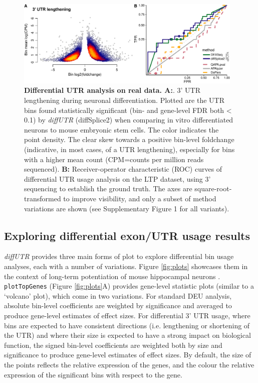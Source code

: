 \documentclass{bmcart}
\begin{document}
\begin{figure}
\includegraphics[width=0.97\textwidth]{figure3.pdf}
\caption{\textbf{Differential UTR analysis on real data. A:}. 3' UTR lengthening during neuronal differentiation. Plotted are the UTR bins found statistically significant (bin- and gene-level FDR both < 0.1) by \textit{diffUTR} (diffSplice2) when comparing in vitro differentiated neurons to mouse embryonic stem cells. The color indicates the point density. The clear skew towards a positive bin-level foldchange (indicative, in most cases, of a UTR lengthening), especially for bins with a higher mean count (CPM=counts per million reads sequenced). \textbf{B:} Receiver-operator characteristic (ROC) curves of differential UTR usage analysis on the LTP dataset, using 3' sequencing to establish the ground truth. The axes are square-root-transformed to improve visibility, and only a subset of method variations are shown (see Supplementary Figure 1 for all variants).}
\label{fig:realdata}
\end{figure}


\subsection*{Exploring differential exon/UTR usage results}

\textit{diffUTR} provides three main forms of plot to explore differential bin usage analyses, each with a number of variations. Figure \ref{fig:plots} showcases them in the context of long-term potentiation of mouse hippocampal neurons \cite{Fontes2017Activity-DependentPotentiation}. \texttt{plotTopGenes} (Figure \ref{fig:plots}A) provides gene-level statistic plots (similar to a `volcano' plot), which come in two variations. For standard DEU analysis, absolute bin-level coefficients are weighted by significance and averaged to produce gene-level estimates of effect sizes. For differential 3' UTR usage, where bins are expected to have consistent directions (i.e. lengthening or shortening of the UTR) and where their size is expected to have a strong impact on biological function, the signed bin-level coefficients are weighted both by size and significance to produce gene-level estimates of effect sizes. By default, the size of the points reflects the relative expression of the genes, and the colour the relative expression of the significant bins with respect to the gene.
\end{document}
